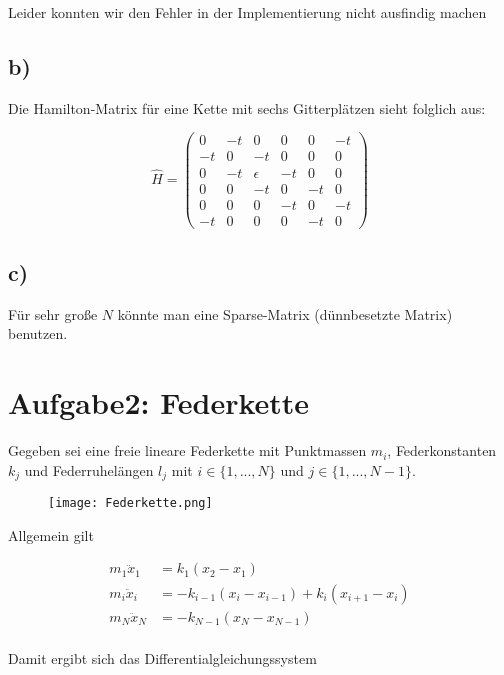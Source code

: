 Leider konnten wir den Fehler in der Implementierung nicht ausfindig machen

\subsection*{b)}
Die Hamilton-Matrix für eine Kette mit sechs Gitterplätzen sieht folglich aus:

\begin{equation*}
  \hat{H}=
\begin{pmatrix}
	0  & -t & 0			 & 0  & 0  & -t \\
	-t & 0  & -t	     & 0  & 0  &  0 \\
	0  & -t & \epsilon  & -t & 0  &  0 \\
	0  & 0  & -t		 & 0  & -t &  0 \\
	0  & 0  & 0			 & -t & 0  &  -t \\
	-t & 0  & 0			 & 0  & -t &  0
\end{pmatrix}
\end{equation*}

\subsection*{c)}
Für sehr große $N$ könnte man eine Sparse-Matrix (dünnbesetzte Matrix) benutzen.

\section*{Aufgabe2: Federkette}
Gegeben sei eine freie lineare Federkette mit Punktmassen $m_i$, Federkonstanten $k_j$ und Federruhelängen $l_j$ mit $i \in \{1, ..., N\}$ und $j \in \{1, ..., N-1\}$.
\begin{figure}[h]
    \centering
    \texttt{[image: Federkette.png]}
    \label{fig:1a}
\end{figure}

\noindent
Allgemein gilt

\begin{align*}
  m_1\ddot{x}_1 &= k_1(x_2 - x_1) \\
  m_i\ddot{x}_i &= -k_{i-1} (x_i - x_{i-1}) + k_i(x_{i+1}-x_i) \\
  m_N\ddot{x}_N &= -k_{N-1}(x_N - x_{N-1}) \\
\end{align*}

\noindent
Damit ergibt sich das Differentialgleichungssystem

